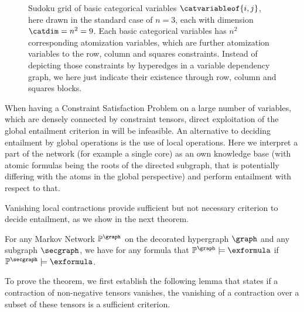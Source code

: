 \begin{example}[Sudoku]
    \begin{figure}
        \begin{center}
            
        \end{center}
        \caption{
            Sudoku grid of basic categorical variables $\catvariableof{i,j}$, here drawn in the standard case of $n=3$, each with dimension $\catdim=n^2=9$.
            Each basic categorical variables has $n^2$ corresponding atomization variables, which are further atomization variables to the row, column and squares constraints.
            Instead of depicting those constraints by hyperedges in a variable dependency graph, we here just indicate their existence through row, column and squares blocks.
        }\label{fig:sudokuGrid}
    \end{figure}
\end{example}




\label{subsec:LocalEntailment}

When having a Constraint Satisfaction Problem on a large number of variables, which are densely connected by constraint tensors, direct exploitation of the global entailment criterion in  will be infeasible.
An alternative to deciding entailment by global operations is the use of local operations.
Here we interpret a part of the network (for example a single core) as an own knowledge base (with atomic formulas being the roots of the directed subgraph, that is potentially differing with the atoms in the global perspective) and perform entailment with respect to that.


Vanishing local contractions provide sufficient but not necessary criterion to decide entailment, as we show in the next theorem.

\begin{theorem}
    \label{the:monotonEntailment}
    For any Markov Network $\probtensor^{\graph}$ on the decorated hypergraph $\graph$ and any subgraph $\secgraph$, we have for any formula that $\probtensor^{\graph}\models\exformula$ if $\probtensor^{\secgraph}\models\exformula$.
\end{theorem}

To prove the theorem, we first establish the following lemma that states if a contraction of non-negative tensors vanishes, the vanishing of a contraction over a subset of these tensors is a sufficient criterion.

